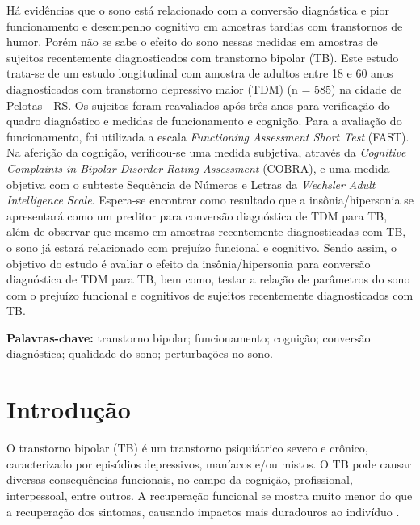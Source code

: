\documentclass[chapter=TITLE,
               oneside,
               12pt,
               a4paper,
               english,
               brazil]{abntex2}    %
\begin{document}
\begin{resumo}

    Há evidências que o sono está relacionado com a conversão diagnóstica
    e pior funcionamento e desempenho cognitivo em amostras tardias com
    transtornos de humor.
    Porém não se sabe o efeito do sono nessas medidas em amostras de sujeitos
    recentemente diagnosticados com transtorno bipolar (TB).
    Este estudo trata-se de um estudo longitudinal com amostra de adultos entre
    18 e 60 anos diagnosticados com transtorno depressivo maior (TDM) (n = 585) na
    cidade de Pelotas - RS. Os sujeitos foram reavaliados após três anos para
    verificação do quadro diagnóstico e medidas de funcionamento e cognição.
    Para a avaliação do funcionamento, foi utilizada a escala
    \textit{Functioning Assessment Short Test} (FAST). Na aferição da cognição,
    verificou-se uma medida subjetiva, através da
    \textit{Cognitive Complaints in Bipolar Disorder Rating Assessment} (COBRA),
    e uma medida objetiva com o subteste Sequência de Números e Letras da
    \textit{Wechsler Adult Intelligence Scale}.
    Espera-se encontrar como resultado que a insônia/hipersonia se apresentará
    como um preditor para conversão diagnóstica de TDM para TB, além de observar
    que mesmo em amostras recentemente diagnosticadas com TB, o sono já estará
    relacionado com prejuízo funcional e cognitivo.
    Sendo assim, o objetivo do estudo é avaliar o efeito da insônia/hipersonia
    para conversão diagnóstica de TDM para TB, bem como, testar a relação de parâmetros
    do sono com o prejuízo funcional e cognitivos de sujeitos recentemente
    diagnosticados com TB.

    \vspace{\onelineskip}

    \textbf{Palavras-chave:} transtorno bipolar; funcionamento; cognição;
    conversão diagnóstica; qualidade do sono; perturbações no sono.

\end{resumo}

\textual

\begingroup
\renewcommand{\cleardoublepage}{}
\renewcommand{\clearpage}{}

\chapter{Introdução}\label{sec:introducao}
    
    O transtorno bipolar (TB) é um transtorno psiquiátrico severo e crônico,
    caracterizado por episódios depressivos, maníacos e/ou mistos.
    O TB pode causar diversas consequências funcionais, no campo da cognição,
    profissional, interpessoal, entre outros.
    A recuperação funcional se mostra muito menor do que a recuperação dos
    sintomas, causando impactos mais duradouros ao indivíduo
    \parencite{american_psychiatric_association_diagnostic_2013}.
    
\end{document}
